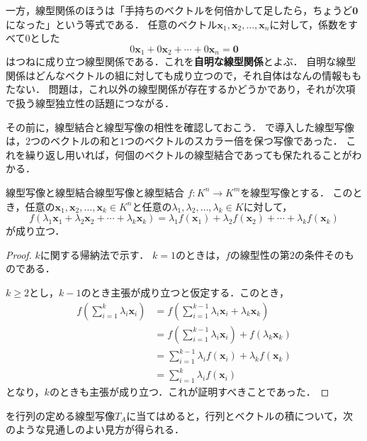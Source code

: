 一方，線型関係のほうは「手持ちのベクトルを何倍かして足したら，ちょうど$\bm{0}$になった」という等式である．
任意のベクトル$\bm{x}_1, \bm{x}_2, \dots, \bm{x}_n$に対して，係数をすべて$0$とした
\[
  0\bm{x}_1 + 0\bm{x}_2 + \cdots + 0\bm{x}_n = \bm{0}
\]
はつねに成り立つ線型関係である．これを\textbf{自明な線型関係}とよぶ．
自明な線型関係はどんなベクトルの組に対しても成り立つので，それ自体はなんの情報ももたない．
問題は，これ以外の線型関係が存在するかどうかであり，それが次項で扱う線型独立性の話題につながる．

その前に，線型結合と線型写像の相性を確認しておこう．
で導入した線型写像は，$2$つのベクトルの和と$1$つのベクトルのスカラー倍を保つ写像であった．
これを繰り返し用いれば，何個のベクトルの線型結合であっても保たれることがわかる．

\begin{prop}{線型写像と線型結合}{線型写像と線型結合}
  $f \colon K^n \to K^m$を線型写像とする．
  このとき，任意の$\bm{x}_1, \bm{x}_2, \dots, \bm{x}_k \in K^n$と任意の$\lambda_1, \lambda_2, \dots, \lambda_k \in K$に対して，
  \[
    f(\lambda_1 \bm{x}_1 + \lambda_2 \bm{x}_2 + \cdots + \lambda_k \bm{x}_k)
    = \lambda_1 f(\bm{x}_1) + \lambda_2 f(\bm{x}_2) + \cdots + \lambda_k f(\bm{x}_k)
  \]
  が成り立つ．
\end{prop}

\begin{tleftbar}
\begin{proof}
  $k$に関する帰納法で示す．
  $k = 1$のときは，$f$の線型性の第$2$の条件そのものである．

  $k \ge 2$とし，$k - 1$のとき主張が成り立つと仮定する．このとき，
  \begin{align}
    f\left(\sum_{i=1}^{k} \lambda_i \bm{x}_i\right)
    &= f\left(\sum_{i=1}^{k-1} \lambda_i \bm{x}_i + \lambda_k \bm{x}_k\right) \nonumber \\
    &= f\left(\sum_{i=1}^{k-1} \lambda_i \bm{x}_i\right) + f(\lambda_k \bm{x}_k) \tag{$f$の線型性} \\
    &= \sum_{i=1}^{k-1} \lambda_i f(\bm{x}_i) + \lambda_k f(\bm{x}_k) \tag{帰納法の仮定と$f$の線型性} \\
    &= \sum_{i=1}^{k} \lambda_i f(\bm{x}_i) \nonumber
  \end{align}
  となり，$k$のときも主張が成り立つ．これが証明すべきことであった．
\end{proof}
\end{tleftbar}

を行列の定める線型写像$T_A$に当てはめると，行列とベクトルの積について，次のような見通しのよい見方が得られる．

